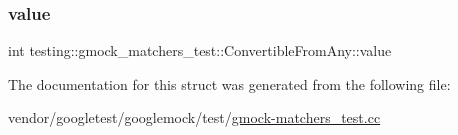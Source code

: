 \subsubsection{\texorpdfstring{value}{value}}
{\footnotesize\ttfamily int testing\+::gmock\+\_\+matchers\+\_\+test\+::\+Convertible\+From\+Any\+::value}



The documentation for this struct was generated from the following file\+:\begin{DoxyCompactItemize}
\item 
vendor/googletest/googlemock/test/\hyperlink{gmock-matchers__test_8cc}{gmock-\/matchers\+\_\+test.\+cc}\end{DoxyCompactItemize}
